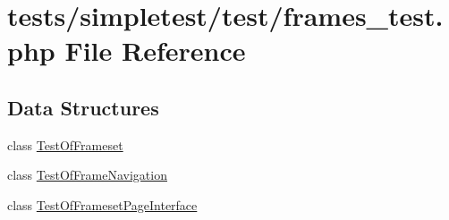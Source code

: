 \hypertarget{frames__test_8php}{\section{tests/simpletest/test/frames\-\_\-test.php File Reference}
\label{frames__test_8php}
}
\subsection*{Data Structures}
\begin{DoxyCompactItemize}
\item 
class \hyperlink{class_test_of_frameset}{Test\-Of\-Frameset}
\item 
class \hyperlink{class_test_of_frame_navigation}{Test\-Of\-Frame\-Navigation}
\item 
class \hyperlink{class_test_of_frameset_page_interface}{Test\-Of\-Frameset\-Page\-Interface}
\end{DoxyCompactItemize}

